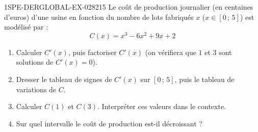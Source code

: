 \begin{exercice}{1SPE-DERGLOBAL-EX-028}{2}{15}
Le coût de production journalier (en centaines d'euros) d'une usine en fonction du nombre de lots fabriqués $x$ ($x \in [0\,;\,5]$) est modélisé par :
\[
C(x) = x^3 - 6x^2 + 9x + 2
\]

\begin{enumerate}
\item Calculer $C'(x)$, puis factoriser $C'(x)$ (on vérifiera que $1$ et $3$ sont solutions de $C'(x) = 0$).
\item Dresser le tableau de signes de $C'(x)$ sur $[0\,;\,5]$, puis le tableau de variations de $C$.
\item Calculer $C(1)$ et $C(3)$. Interpréter ces valeurs dans le contexte.
\item Sur quel intervalle le coût de production est-il décroissant ?
\end{enumerate}
\end{exercice}
